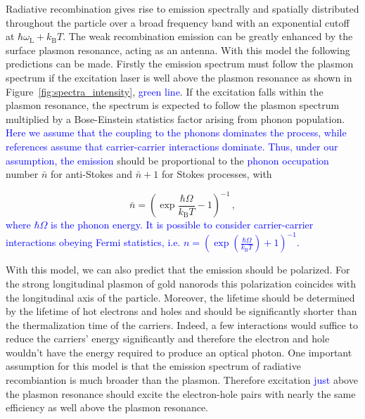 \documentclass[journal=nalefd,manuscript=letter]{achemso}
\newcommand{\HI}[1]{\textcolor{blue}{#1}} %
\begin{document}
Radiative recombination gives rise to emission spectrally and
spatially distributed throughout the particle over a broad frequency band with
an exponential cutoff at $\hbar\omega_\textrm{L}+k_\textrm{B}T$. The weak
recombination emission can be greatly enhanced by the surface plasmon resonance,
acting as an antenna. 
With this model the following predictions can be made.
Firstly the emission spectrum must follow the plasmon spectrum if the excitation
laser is well above the plasmon resonance as shown in \mbox{Figure
\ref{fig:spectra_intensity}}, \HI{green line}. If the excitation falls within the
plasmon resonance, the spectrum is expected to follow the plasmon spectrum
multiplied by a Bose-Einstein statistics factor arising from phonon population. 
\HI{Here we assume that the coupling to the phonons dominates the process, while references
\cite{Huang2014,mertens2017light} assume that carrier-carrier interactions dominate.
Thus, under our assumption, the emission} should be proportional to the \HI{phonon occupation} number $\bar{n}$ 
for anti-Stokes and $\bar{n}+1$ for Stokes processes, with

\begin{equation}\label{eqn:BE}
	\bar{n}=\left(\exp\frac{\hbar\Omega}{k_\textrm{B}T}-1\right)^{-1}\,,
\end{equation}
\HI{where $\hbar\Omega$ is the phonon energy. It is possible to consider 
carrier-carrier interactions obeying Fermi statistics, i.e. $n=\left(\exp(\frac{\hbar \Omega}{k_\textrm{B}T})+1 \right)^{-1}$\cite{Huang2014,mertens2017light}.} 

With this model, we can also predict that the emission should be polarized. 
For the strong longitudinal plasmon of gold nanorods this polarization coincides with
the longitudinal axis of the particle\cite{He2015}. Moreover, the lifetime
should be determined by the lifetime of hot electrons and holes and should be
significantly shorter than the thermalization time of the carriers. 
Indeed, a few interactions would suffice to reduce the carriers' energy significantly
and therefore the electron and hole wouldn't have the energy required to produce an
optical photon. 
One important assumption for this model is that the emission spectrum
of radiative recombiantion is much broader than the plasmon. 
Therefore excitation \HI{just} above the plasmon resonance should excite the 
electron-hole pairs with nearly the same efficiency as well above the plasmon
resonance\cite{Cheng2015,mertens2017light}. 
\end{document}
